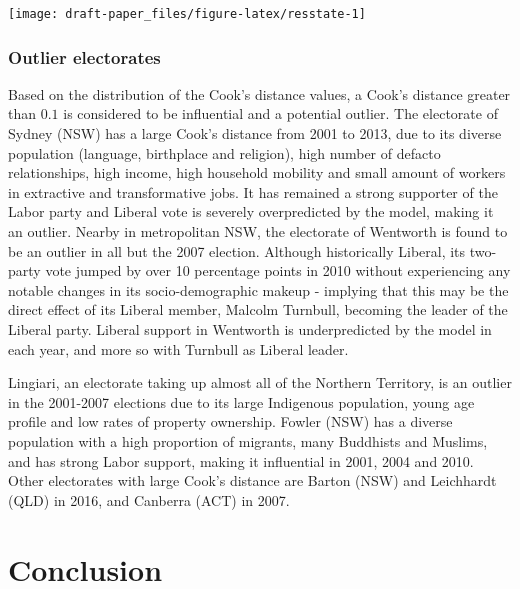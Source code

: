 \documentclass[11pt,a4paper,]{article}
\let\origfigure\figure
\let\endorigfigure\endfigure
\renewenvironment{figure}[1][2] {
    \expandafter\origfigure\expandafter[H]
} {
    \endorigfigure
}
\begin{document}
\begin{figure}[h]

{\centering \texttt{[image: draft-paper\_files/figure-latex/resstate-1]} 

}

\caption{Boxplot of residuals by state with jittered points.}\label{fig:resstate}
\end{figure}

\hypertarget{outlier-electorates}{%
\subsubsection{Outlier electorates}\label{outlier-electorates}}

Based on the distribution of the Cook's distance values, a Cook's distance greater than \(0.1\) is considered to be influential and a potential outlier. The electorate of Sydney (NSW) has a large Cook's distance from 2001 to 2013, due to its diverse population (language, birthplace and religion), high number of defacto relationships, high income, high household mobility and small amount of workers in extractive and transformative jobs. It has remained a strong supporter of the Labor party and Liberal vote is severely overpredicted by the model, making it an outlier. Nearby in metropolitan NSW, the electorate of Wentworth is found to be an outlier in all but the 2007 election. Although historically Liberal, its two-party vote jumped by over 10 percentage points in 2010 without experiencing any notable changes in its socio-demographic makeup - implying that this may be the direct effect of its Liberal member, Malcolm Turnbull, becoming the leader of the Liberal party. Liberal support in Wentworth is underpredicted by the model in each year, and more so with Turnbull as Liberal leader.

Lingiari, an electorate taking up almost all of the Northern Territory, is an outlier in the 2001-2007 elections due to its large Indigenous population, young age profile and low rates of property ownership. Fowler (NSW) has a diverse population with a high proportion of migrants, many Buddhists and Muslims, and has strong Labor support, making it influential in 2001, 2004 and 2010. Other electorates with large Cook's distance are Barton (NSW) and Leichhardt (QLD) in 2016, and Canberra (ACT) in 2007.

\hypertarget{conclusion}{%
\section{Conclusion}\label{conclusion}}
\end{document}
